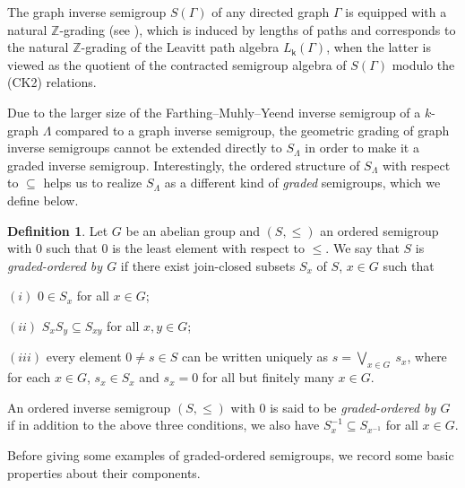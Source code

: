 \documentclass[a4paper,reqno,11pt]{amsart}
\numberwithin{equation}{section}
\theoremstyle{definition}
\newtheorem{dfn}[thm]{Definition}
\theoremstyle{remark}
\begin{document}
The graph inverse semigroup $S(\Gamma)$ of any directed graph $\Gamma$ is equipped with a natural $\mathbb{Z}$-grading (see \cite[\S 8]{HazMes}), which is induced by lengths of paths and corresponds to the natural $\mathbb{Z}$-grading of the Leavitt path algebra $L_\mathsf{k}(\Gamma)$, when the latter is viewed as the quotient of the contracted semigroup algebra of $S(\Gamma)$ modulo the (CK2) relations. 

Due to the larger size of the Farthing--Muhly--Yeend inverse semigroup of a $k$-graph $\Lambda$ compared to a graph inverse semigroup, the geometric grading of graph inverse semigroups cannot be extended directly to $S_\Lambda$ in order to make it a graded inverse semigroup. Interestingly, the ordered structure of $S_\Lambda$ with respect to $\subseteq$ helps us to realize $S_\Lambda$ as a different kind of \emph{graded} semigroups, which we define below.

\begin{dfn}\label{def graded-ordered semigroup}
Let $G$ be an abelian group and $(S,\leqslant)$ an ordered semigroup with $0$ such that $0$ is the least element with respect to $\leqslant$. We say that $S$ is \emph{graded-ordered by $G$} if there exist join-closed subsets $S_x$ of $S$, $x\in G$ such that 

$(i)$ $0\in S_x$ for all $x\in G$;

$(ii)$ $S_x S_y\subseteq S_{xy}$ for all $x,y\in G$;

$(iii)$ every element $0\neq s\in S$ can be written uniquely as $s=\displaystyle{\bigvee_{x\in G}}~s_x$, where for each $x\in G$, $s_x\in S_x$ and $s_x=0$ for all but finitely many $x\in G$.

An ordered inverse semigroup $(S,\leqslant)$ with $0$ is said to be \emph{graded-ordered by $G$} if in addition to the above three conditions, we also have $S_x^{-1}\subseteq S_{x^{-1}}$ for all $x\in G$.   
\end{dfn}

Before giving some examples of graded-ordered semigroups, we record some basic properties about their components. 
\end{document}
